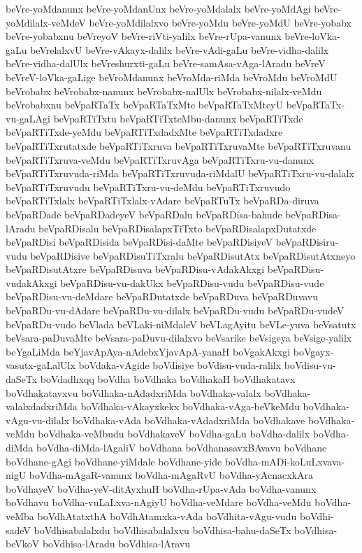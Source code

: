 {beVre-yoMdanunx
beVre-yoMdanUnx
beVre-yoMdalalx
beVre-yoMdAgi
beVre-yoMdilalx-veMdeV
beVre-yoMdilalxvo
beVre-yoMdu
beVre-yoMdU
beVre-yobabx
beVre-yobabxnu
beVreyoV
beVre-riVti-yalilx
beVre-rUpa-vanunx
beVre-loVka-gaLu
beVrelalxvU
beVre-vAkayx-dalilx
beVre-vAdi-gaLu
beVre-vidha-dalilx
beVre-vidha-dalUlx
beVreshurxti-gaLu
beVre-samAsa-vAga-lAradu
beVreV
beVreV-loVka-gaLige
beVroMdanunx
beVroMda-riMda
beVroMdu
beVroMdU
beVrobabx
beVrobabx-nanunx
beVrobabx-nalUlx
beVrobabx-nilalx-veMdu
beVrobabxnu
beVpaRTaTx
beVpaRTaTxMte
beVpaRTaTxMteyU
beVpaRTaTx-vu-gaLAgi
beVpaRTiTxtu
beVpaRTiTxteMbu-danunx
beVpaRTiTxde
beVpaRTiTxde-yeMdu
beVpaRTiTxdadxMte
beVpaRTiTxdadxre
beVpaRTiTxrutatxde
beVpaRTiTxruva
beVpaRTiTxruvaMte
beVpaRTiTxruvanu
beVpaRTiTxruva-veMdu
beVpaRTiTxruvAga
beVpaRTiTxru-vu-danunx
beVpaRTiTxruvuda-riMda
beVpaRTiTxruvuda-riMdalU
beVpaRTiTxru-vu-dalalx
beVpaRTiTxruvudu
beVpaRTiTxru-vu-deMdu
beVpaRTiTxruvudo
beVpaRTiTxlalx
beVpaRTiTxlalx-vAdare
beVpaRTuTx
beVpaRDa-diruva
beVpaRDade
beVpaRDadeyeV
beVpaRDalu
beVpaRDisa-bahude
beVpaRDisa-lAradu
beVpaRDisalu
beVpaRDisalapxTiTxto
beVpaRDisalapxDutatxde
beVpaRDisi
beVpaRDisida
beVpaRDisi-daMte
beVpaRDisiyeV
beVpaRDisiru-vudu
beVpaRDisive
beVpaRDisuTiTxralu
beVpaRDisutAtx
beVpaRDisutAtxneyo
beVpaRDisutAtxre
beVpaRDisuva
beVpaRDisu-vAdakAkxgi
beVpaRDisu-vudakAkxgi
beVpaRDisu-vu-dakUkx
beVpaRDisu-vudu
beVpaRDisu-vude
beVpaRDisu-vu-deMdare
beVpaRDutatxde
beVpaRDuva
beVpaRDuvavu
beVpaRDu-vu-dAdare
beVpaRDu-vu-dilalx
beVpaRDu-vudu
beVpaRDu-vudeV
beVpaRDu-vudo
beVlada
beVLaki-niMdaleV
beVLagAyitu
beVLe-yuva
beVsatutx
beVsara-paDuvaMte
beVsara-paDuvu-dilalxvo
beVsarike
beVsigeya
beVsige-yalilx
beYgaLiMda
beYjavApAya-nAdebxYjavApA-yanaH
boVgakAkxgi
boVgayx-vasutx-gaLalUlx
boVdaka-vAgide
boVdisiye
boVdisu-vuda-ralilx
boVdisu-vu-daSeTx
boVdadhxqq
boVdha
boVdhaka
boVdhakaH
boVdhakatavx
boVdhakatavxvu
boVdhaka-nAdadxriMda
boVdhaka-valalx
boVdhaka-valalxdadxriMda
boVdhaka-vAkayxkekx
boVdhaka-vAga-beVkeMdu
boVdhaka-vAgu-vu-dilalx
boVdhaka-vAda
boVdhaka-vAdadxriMda
boVdhakave
boVdhaka-veMdu
boVdhaka-veMbudu
boVdhakaveV
boVdha-gaLu
boVdha-dalilx
boVdha-diMda
boVdha-diMda-lAgaliV
boVdhana
boVdhanasavxBAvavu
boVdhane
boVdhane-gAgi
boVdhane-yiMdale
boVdhane-yide
boVdha-mADi-koLuLxvava-nigU
boVdha-mAgaR-vanunx
boVdha-mAgaRvU
boVdha-yAcnacxkAra
boVdhayeV
boVdha-yeV-ditAyxhuH
boVdha-rUpa-vAda
boVdha-vanunx
boVdhavu
boVdha-vuLaLxva-nAgiyU
boVdha-veMdare
boVdha-veMdu
boVdha-veMba
boVdhAtatxthA
boVdhAtamxka-vAda
boVdhita-vAgu-vudu
boVdhi-sadeV
boVdhisabalalxdu
boVdhisabalalxvu
boVdhisa-bahu-daSeTx
boVdhisa-beVkoV
boVdhisa-lAradu
boVdhisa-lAravu
}
